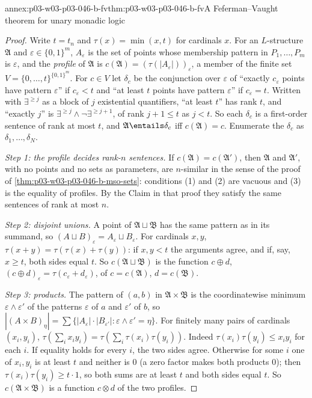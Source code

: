 \begin{annexitem}{annex:p03-w03-p03-046-b-fv}{thm:p03-w03-p03-046-b-fv}{A Feferman--Vaught theorem for unary monadic logic}
\begin{proof}
Write \(t=t_n\) and \(\tau(x)=\min(x,t)\) for cardinals \(x\). For an
\(L\)-structure \(\mathfrak A\) and \(\varepsilon\in\{0,1\}^m\), \(A_\varepsilon\)
is the set of points whose membership pattern in \(P_1,\dots,P_m\) is
\(\varepsilon\), and the \emph{profile} of \(\mathfrak A\) is
\(c(\mathfrak A)=(\tau(|A_\varepsilon|))_{\varepsilon}\), a member of the
finite set \(V=\{0,\dots,t\}^{\{0,1\}^m}\). For \(c\in V\) let \(\delta_c\) be
the conjunction over \(\varepsilon\) of ``exactly \(c_\varepsilon\) points
have pattern \(\varepsilon\)'' if \(c_\varepsilon<t\) and ``at least \(t\)
points have pattern \(\varepsilon\)'' if \(c_\varepsilon=t\). Written with
\(\exists^{\ge j}\) as a block of \(j\) existential quantifiers, ``at least
\(t\)'' has rank \(t\), and ``exactly \(j\)'' is \(\exists^{\ge
j}\wedge\neg\exists^{\ge j+1}\), of rank \(j+1\le t\) as \(j<t\). So each
\(\delta_c\) is a first-order sentence of rank at most \(t\), and
\(\mathfrak A\entails\delta_c\) iff \(c(\mathfrak A)=c\). Enumerate the
\(\delta_c\) as \(\delta_1,\dots,\delta_N\).

\emph{Step 1: the profile decides rank-\(n\) sentences.} If
\(c(\mathfrak A)=c(\mathfrak A')\), then \(\mathfrak A\) and \(\mathfrak
A'\), with no points and no sets as parameters, are \(n\)-similar in the
sense of the proof of \cref{thm:p03-w03-p03-046-b-mso-sets}: conditions
(1) and (2) are vacuous and (3) is the equality of profiles. By the Claim
in that proof they satisfy the same sentences of rank at most \(n\).

\emph{Step 2: disjoint unions.} A point of \(\mathfrak A\sqcup\mathfrak B\)
has the same pattern as in its summand, so
\((A\sqcup B)_\varepsilon=A_\varepsilon\sqcup B_\varepsilon\). For cardinals
\(x,y\), \(\tau(x+y)=\tau(\tau(x)+\tau(y))\): if \(x,y<t\) the arguments
agree, and if, say, \(x\ge t\), both sides equal \(t\). So
\(c(\mathfrak A\sqcup\mathfrak B)\) is the function \(c\oplus d\),
\((c\oplus d)_\varepsilon=\tau(c_\varepsilon+d_\varepsilon)\), of
\(c=c(\mathfrak A)\), \(d=c(\mathfrak B)\).

\emph{Step 3: products.} The pattern of \((a,b)\) in
\(\mathfrak A\times\mathfrak B\) is the coordinatewise minimum
\(\varepsilon\wedge\varepsilon'\) of the patterns \(\varepsilon\) of \(a\)
and \(\varepsilon'\) of \(b\), so \(|(A\times B)_\eta|=\sum\{|A_\varepsilon|\cdot
|B_{\varepsilon'}|:\varepsilon\wedge\varepsilon'=\eta\}\). For finitely many
pairs of cardinals \((x_i,y_i)\),
\(\tau(\sum_ix_iy_i)=\tau(\sum_i\tau(x_i)\tau(y_i))\). Indeed
\(\tau(x_i)\tau(y_i)\le x_iy_i\) for each \(i\). If equality holds for
every \(i\), the two sides agree. Otherwise for some \(i\) one of
\(x_i,y_i\) is at least \(t\) and neither is \(0\) (a zero factor makes both
products \(0\)); then \(\tau(x_i)\tau(y_i)\ge t\cdot1\), so both sums are at
least \(t\) and both sides equal \(t\). So \(c(\mathfrak A\times\mathfrak B)\)
is a function \(c\otimes d\) of the two profiles.


\end{proof}
\end{annexitem}
